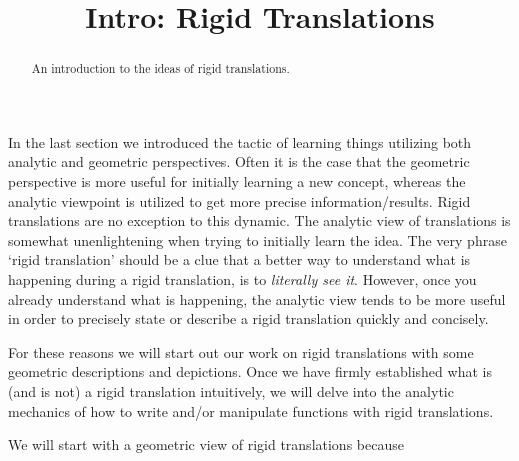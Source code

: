 \documentclass{ximera}
\title{Intro: Rigid Translations}
\begin{document}
\begin{abstract}
    An introduction to the ideas of rigid translations.
\end{abstract}
\maketitle

In the last section we introduced the tactic of learning things utilizing both analytic and geometric perspectives. Often it is the case that the geometric perspective is more useful for initially learning a new concept, whereas the analytic viewpoint is utilized to get more precise information/results. Rigid translations are no exception to this dynamic. The analytic view of translations is somewhat unenlightening when trying to initially learn the idea. The very phrase `rigid translation' should be a clue that a better way to understand what is happening during a rigid translation, is to \textit{literally see it}. However, once you already understand what is happening, the analytic view tends to be more useful in order to precisely state or describe a rigid translation quickly and concisely.

For these reasons we will start out our work on rigid translations with some geometric descriptions and depictions. Once we have firmly established what is (and is not) a rigid translation intuitively, we will delve into the analytic mechanics of how to write and/or manipulate functions with rigid translations.

\begin{problem}
    We will start with a geometric view of rigid translations because
    \begin{multipleChoice}
    \end{multipleChoice}
\end{problem}
\end{document}
